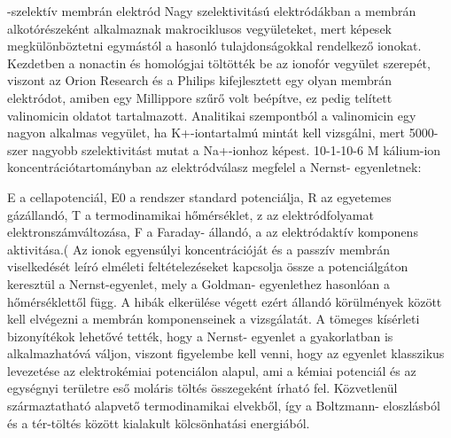 {-szelektív membrán elektród
Nagy szelektivitású elektródákban a membrán alkotórészeként alkalmaznak makrociklusos vegyületeket, mert képesek megkülönböztetni egymástól a hasonló tulajdonságokkal rendelkező ionokat. Kezdetben a nonactin és homológjai töltötték be az ionofór vegyület szerepét, viszont az Orion Research és a Philips kifejlesztett egy olyan membrán elektródot, amiben egy Millippore szűrő volt beépítve, ez pedig telített valinomicin oldatot tartalmazott. Analitikai szempontból a valinomicin egy nagyon alkalmas vegyület, ha K+-iontartalmú mintát kell vizsgálni, mert 5000-szer nagyobb szelektivitást mutat a Na+-ionhoz képest. 10-1-10-6 M kálium-ion koncentrációtartományban az elektródválasz megfelel a Nernst- egyenletnek:

E a cellapotenciál, E0 a rendszer standard potenciálja, R az egyetemes gázállandó, T a termodinamikai hőmérséklet, z az elektródfolyamat elektronszámváltozása, F a Faraday- állandó, a az elektródaktív komponens aktivitása.( Az ionok egyensúlyi koncentrációját és a passzív membrán viselkedését leíró elméleti feltételezéseket kapcsolja össze a potenciálgáton keresztül a Nernst-egyenlet, mely a Goldman- egyenlethez hasonlóan a hőmérséklettől függ. A hibák elkerülése végett ezért állandó körülmények között kell elvégezni a membrán komponenseinek a vizsgálatát.  A tömeges kísérleti bizonyítékok lehetővé tették, hogy a Nernst- egyenlet a gyakorlatban is alkalmazhatóvá váljon, viszont figyelembe kell venni, hogy az egyenlet klasszikus levezetése az elektrokémiai potenciálon alapul, ami a kémiai potenciál és az egységnyi területre eső moláris töltés összegeként írható fel. Közvetlenül származtatható alapvető termodinamikai elvekből, így a Boltzmann- eloszlásból és a tér-töltés  között kialakult kölcsönhatási energiából.  }
